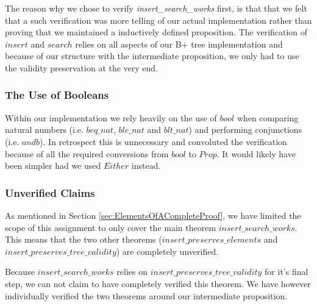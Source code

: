 The reason why we chose to verify \textit{insert\_search\_works} first, is that that we felt that a such verification was more telling of our actual implementation rather than proving that we maintained a inductively defined proposition. The verification of $insert$ and $search$ relies on all aspects of our B+ tree implementation and because of our structure with the intermediate proposition, we only had to use the validity preservation at the very end.

\subsubsection{The Use of Booleans}

Within our implementation we rely heavily on the use of $bool$ when comparing natural numbers (i.e. $beq\_nat$, $ble\_nat$ and $blt\_nat$) and performing conjunctions (i.e. $andb$). In retrospect this is unnecessary and convoluted the verification because of all the required conversions from $bool$ to $Prop$. It would likely have been simpler had we used $Either$ instead.

\subsubsection{Unverified Claims}

As mentioned in Section \ref{sec:ElementsOfACompleteProof}, we have limited the scope of this assignment to only cover the main theorem $insert\_search\_works$. This means that the two other theorems ($insert\allowbreak{}\_preserves\allowbreak{}\_elements$ and $insert\allowbreak{}\_preserves\allowbreak{}\_tree\allowbreak{}\_validity$) are completely unverified.

Because $insert\_search\_works$ relies on $insert\_preserves\_tree\_validity$ for it's final step, we can not claim to have completely verified this theorem. We have however individually verified the two theorems around our intermediate proposition.
